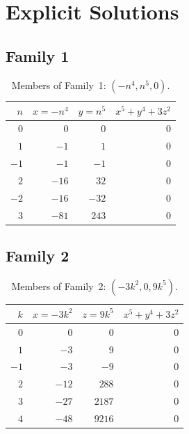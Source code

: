 \documentclass[12pt,a4paper]{article}
\theoremstyle{definition}
\begin{document}
\section{Explicit Solutions}\label{sec:explicit}

\subsection{Family 1}

\begin{table}[h]
\centering
\caption{Members of Family~1: $(-n^4, n^5, 0)$.}
\label{tab:family1}
\renewcommand{\arraystretch}{1.2}
\begin{tabular}{rrrr}
\toprule
$n$ & $x = -n^4$ & $y = n^5$ & $x^5 + y^4 + 3z^2$ \\
\midrule
$0$  & $0$    & $0$     & $0$ \\
$1$  & $-1$   & $1$     & $0$ \\
$-1$ & $-1$   & $-1$    & $0$ \\
$2$  & $-16$  & $32$    & $0$ \\
$-2$ & $-16$  & $-32$   & $0$ \\
$3$  & $-81$  & $243$   & $0$ \\
\bottomrule
\end{tabular}
\end{table}

\subsection{Family 2}

\begin{table}[h]
\centering
\caption{Members of Family~2: $(-3k^2, 0, 9k^5)$.}
\label{tab:family2}
\renewcommand{\arraystretch}{1.2}
\begin{tabular}{rrrr}
\toprule
$k$ & $x = -3k^2$ & $z = 9k^5$ & $x^5 + y^4 + 3z^2$ \\
\midrule
$0$  & $0$    & $0$      & $0$ \\
$1$  & $-3$   & $9$      & $0$ \\
$-1$ & $-3$   & $-9$     & $0$ \\
$2$  & $-12$  & $288$    & $0$ \\
$3$  & $-27$  & $2187$   & $0$ \\
$4$  & $-48$  & $9216$   & $0$ \\
\bottomrule
\end{tabular}
\end{table}
\end{document}
